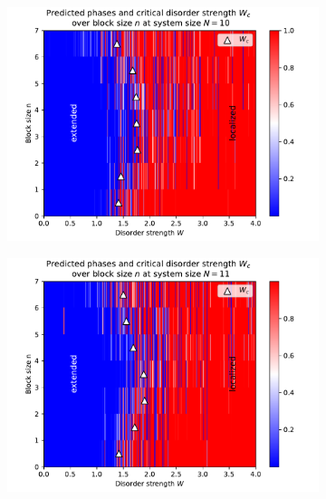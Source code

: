 \documentclass[reprint,amsmath,amssymb,aps,prb]{revtex4-2}
\begin{document}
\begin{center}
\begin{figure}[H]
\begin{subfigure}[c]{0.45\textwidth}
			\includegraphics[width=\textwidth]{../results/Wc/N10_Wc_n_dependency.pdf}
		\end{subfigure}
		\begin{subfigure}[c]{0.45\textwidth}
			\includegraphics[width=\textwidth]{../results/Wc/N11_Wc_n_dependency.pdf}
		\end{subfigure}
		\begin{subfigure}[c]{0.45\textwidth}

\end{subfigure}
\end{figure}
\end{center}
\end{document}

